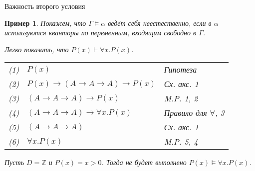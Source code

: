 \documentclass[aspectratio=169]{beamer}
\newtheorem{exm}{Пример}[section]
\begin{document}
\begin{frame}{Важность второго условия}
\begin{exm}Покажем, что $\Gamma\models\alpha$ ведёт себя неестественно, если 
в $\alpha$ используются кванторы по переменным, входящим свободно в $\Gamma$.\pause

Легко показать, что $P(x)\vdash \forall x.P(x)$. \pause
\begin{tabular}{lll}
(1) & $P(x)$ & Гипотеза \\
(2) & $P(x)\rightarrow (A\rightarrow A \rightarrow A) \rightarrow P(x)$ & Сх. акс. 1\\
(3) & $(A\rightarrow A \rightarrow A) \rightarrow P(x)$ & M.P. 1, 2\\
(4) & $(A\rightarrow A \rightarrow A) \rightarrow \forall x.P(x)$ & Правило для $\forall$, 3\\
(5) & $(A\rightarrow A \rightarrow A)$ & Сх. акс. 1\\
(6) & $\forall x.P(x)$ & M.P. 5, 4
\end{tabular}\pause

Пусть $D = \mathbb{Z}$ и $P(x) = x > 0$. Тогда не будет выполнено $P(x)\models \forall x.P(x)$.
\end{exm}
\end{frame}
\end{document}
